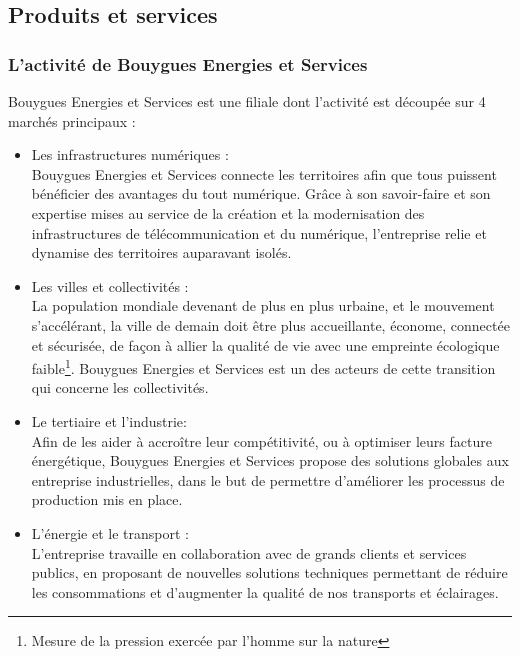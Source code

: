 \documentclass[a4paper]{article}
\begin{document}
    \vfill 

    \newpage

    \subsection{Produits et services}
 
    \subsubsection{L'activité de Bouygues Energies et Services}
    Bouygues Energies et Services est une filiale dont l'activité est découpée sur 4 marchés principaux : \\
    
    \begin{itemize}

    \item Les infrastructures numériques : \\
        
        Bouygues Energies et Services connecte les territoires afin que tous puissent bénéficier des avantages du tout numérique. Grâce à son savoir-faire et son expertise mises au service de la création et la modernisation des infrastructures de télécommunication et du numérique, l'entreprise relie et dynamise des territoires auparavant isolés. \\

    \item Les villes et collectivités : \\

        La population mondiale devenant de plus en plus urbaine, et le mouvement s'accélérant, la ville de demain doit être plus accueillante, économe, connectée et sécurisée, de façon à allier la qualité de vie avec une empreinte écologique faible\footnote{Mesure de la pression exercée par l'homme sur la nature}. Bouygues Energies et Services est un des acteurs de cette transition qui concerne les collectivités. \\

    \item Le tertiaire et l'industrie: \\

        Afin de les aider à accroître leur compétitivité, ou à optimiser leurs facture énergétique, Bouygues Energies et Services propose des solutions globales aux entreprise industrielles, dans le but de permettre d'améliorer les processus de production mis en place. \\

    \item L'énergie et le transport : \\

        L'entreprise travaille en collaboration avec de grands clients et services publics, en proposant de nouvelles solutions techniques permettant de réduire les consommations et d'augmenter la qualité de nos transports et éclairages. 

    \end{itemize}
    \vspace{5pt}
    
\end{document}
